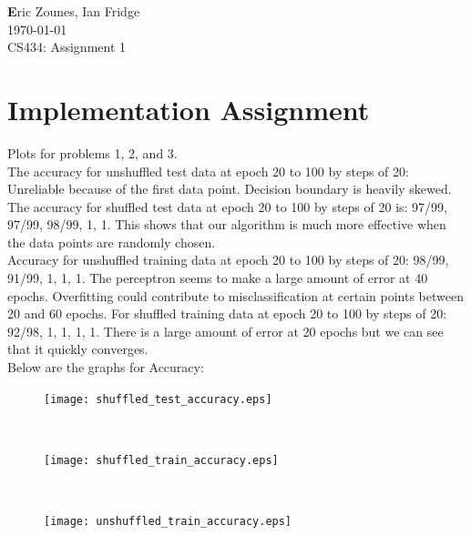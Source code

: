 \documentclass[letterpaper,10pt,titlepage]{article}
\begin{document}
\begin{flushright}
\end{flushright}
\begin{flushleft}
\textbf Eric Zounes, Ian Fridge \\
\today  \\
CS434: Assignment 1 
\end{flushleft}
\section[1]{Implementation Assignment} 
\large Plots for problems 1, 2, and 3. \\ 

The accuracy for unshuffled test data at epoch 20 to 100 by steps of 20: Unreliable because of the first data point. Decision boundary is heavily skewed. The accuracy for shuffled test data  at epoch 20 to 100 by steps of 20 is: 97/99, 97/99, 98/99, 1, 1. This shows that our algorithm is much more effective when the data points are randomly chosen. \\
Accuracy for unshuffled training data at epoch 20 to 100 by steps of 20: 98/99, 91/99, 1, 1, 1. The perceptron seems to make a large amount of error at 40 epochs. Overfitting could contribute to misclassification at certain points between 20 and 60 epochs. For shuffled training data at epoch 20 to 100 by steps of 20: 92/98, 1, 1, 1, 1. There is a large amount of error at 20 epochs but we can see that it quickly converges. \\
Below are the graphs for Accuracy: \\

\begin{figure}[th!]
\centering
\texttt{[image: shuffled\_test\_accuracy.eps]} 
\end{figure} 
\\[5mm]

\begin{figure}[th!]
\centering
\texttt{[image: shuffled\_train\_accuracy.eps]} 
\end{figure} 
\\[5mm]

\begin{figure}[th!]
\centering
\texttt{[image: unshuffled\_train\_accuracy.eps]} 
\end{figure} 
\\[5mm]
\end{document}
